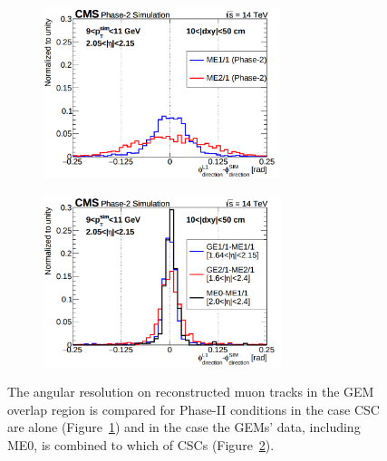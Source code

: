 	\begin{figure}[H]
		\begin{subfigure}{0.5\linewidth}
			\centering
			\includegraphics[height=5cm]{fig/chapt3/CSC-angular-res.png}
			\caption{\label{fig:CSC-GEM-res:A}}
		\end{subfigure}
		\begin{subfigure}{0.5\linewidth}
			\centering
			\includegraphics[height=5cm]{fig/chapt3/GEM-angular-res.png}
			\caption{\label{fig:CSC-GEM-res:B}}
		\end{subfigure}
		\caption{\label{fig:CSC-GEM-res} The angular resolution on reconstructed muon tracks in the GEM overlap region  is compared for Phase-II conditions in the case CSC are alone (Figure~\ref{fig:CSC-GEM-res:A}) and in the case the GEMs' data, including ME0, is combined to which of CSCs (Figure~\ref{fig:CSC-GEM-res:B}).}
	\end{figure}
	
